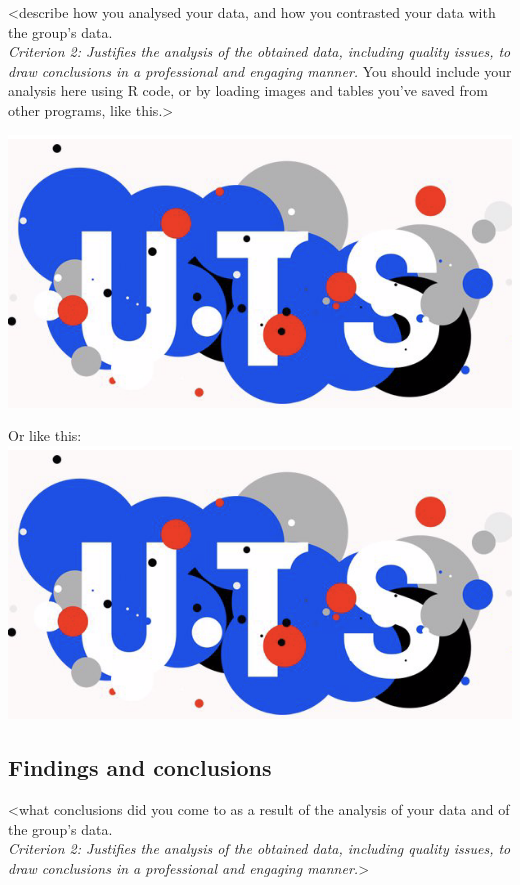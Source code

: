 \documentclass[
]{article}
\begin{document}
\textless describe how you analysed your data, and how you contrasted
your data with the group's data.\\
\emph{Criterion 2: Justifies the analysis of the obtained data,
including quality issues, to draw conclusions in a professional and
engaging manner.} You should include your analysis here using R code, or
by loading images and tables you've saved from other programs, like
this.\textgreater{}

\includegraphics{uts_logo_new.png}

Or like this: \includegraphics{uts_logo_new.png}

\hypertarget{findings-and-conclusions}{%
\subsection{Findings and conclusions}\label{findings-and-conclusions}}

\textless what conclusions did you come to as a result of the analysis
of your data and of the group's data.\\
\emph{Criterion 2: Justifies the analysis of the obtained data,
including quality issues, to draw conclusions in a professional and
engaging manner.}\textgreater{}
\end{document}
